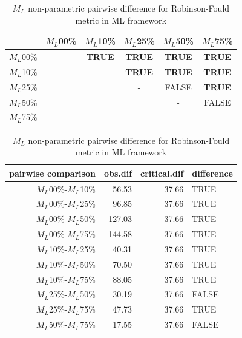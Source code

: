 \documentclass[12pt,letterpaper]{article}
\begin{document}
\begin{table}
\caption{$M_L$ non-parametric pairwise difference for Robinson-Fould metric in ML framework} %
\centering
\begin{tabular}{c|ccccc}
    \hline
              & $M_L$00\% & $M_L$10\% & $M_L$25\% & $M_L$50\% & $M_L$75\% \\
    \hline
    $M_L$00\% & - & \textbf{TRUE}  & \textbf{TRUE} & \textbf{TRUE} & \textbf{TRUE}\\
    $M_L$10\% & & - & \textbf{TRUE}  & \textbf{TRUE} & \textbf{TRUE} \\
    $M_L$25\% & & & - & FALSE  & \textbf{TRUE} \\
    $M_L$50\% & & & & - & FALSE  \\
    $M_L$75\% & & & & & - \\
    \hline
\end{tabular}
\centering
\begin{tabular}{rrrl}
 pairwise comparison & obs.dif & critical.dif & difference \\ 
  \hline
  $M_L$00\%-$M_L$10\% & 56.53 & 37.66 & TRUE \\ 
  $M_L$00\%-$M_L$25\% & 96.85 & 37.66 & TRUE \\ 
  $M_L$00\%-$M_L$50\% & 127.03 & 37.66 & TRUE \\ 
  $M_L$00\%-$M_L$75\% & 144.58 & 37.66 & TRUE \\ 
  $M_L$10\%-$M_L$25\% & 40.31 & 37.66 & TRUE \\ 
  $M_L$10\%-$M_L$50\% & 70.50 & 37.66 & TRUE \\ 
  $M_L$10\%-$M_L$75\% & 88.05 & 37.66 & TRUE \\ 
  $M_L$25\%-$M_L$50\% & 30.19 & 37.66 & FALSE \\ 
  $M_L$25\%-$M_L$75\% & 47.73 & 37.66 & TRUE \\ 
  $M_L$50\%-$M_L$75\% & 17.55 & 37.66 & FALSE \\ 
   \hline
\end{tabular}
\label{ML_RF-ML_results}
\end{table}
\end{document}
